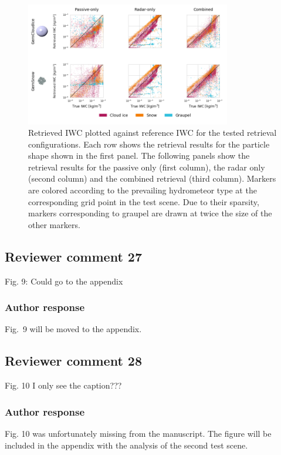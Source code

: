 \documentclass[11pt]{scrartcl}
\begin{document}
\begin{figure}
\centering \includegraphics[width = 0.8\textwidth]{../plots/results_scatter_a.png}
\caption{Retrieved IWC plotted against reference IWC for the tested retrieval
  configurations. Each row shows the retrieval results for the particle shape
  shown in the first panel. The following panels show the retrieval results for
  the passive only (first column), the radar only (second column) and the
  combined retrieval (third column). Markers are colored according to the
  prevailing hydrometeor type at the corresponding grid point in the test
  scene. Due to their sparsity, markers corresponding to graupel are drawn at
  twice the size of the other markers.}
\label{fig:results_scatter_a_1}
\end{figure}

\subsection*{Reviewer comment 27}
Fig. 9: Could go to the appendix

\subsubsection*{Author response}
Fig.~9 will be moved to the appendix.

\subsection*{Reviewer comment 28}
Fig. 10 I only see the caption???

\subsubsection*{Author response}
Fig. 10 was unfortunately missing from the manuscript. The figure will be included in the appendix
with the analysis of the second test scene.
\end{document}
